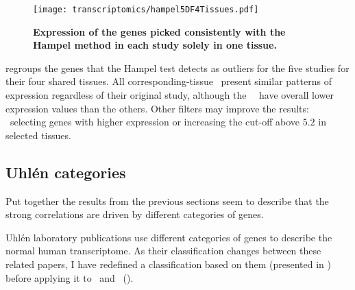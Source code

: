 \begin{figure}[!ht]
    \texttt{[image: transcriptomics/hampel5DF4Tissues.pdf]}\centering
    \caption[Expression of the genes picked with Hampel method]{\label{fig:hampelExp}%
    \textbf{Expression of the genes picked consistently with the Hampel method
    in each study solely in one tissue.}}
\end{figure}

 regroups the genes that the Hampel test detects
as outliers for the five studies for their four shared tissues.
All corresponding-tissue \treps\ present similar patterns of expression
regardless of their original study,
although the \castle\ \treps\ have overall lower expression values than the others.
Other filters may improve the results:
\eg\ selecting genes with higher expression or
increasing the cut-off above $5.2$ in selected tissues.

\subsection{Uhlén categories}\label{sub:UhlenGeneCat}

Put together the results from the previous sections seem to describe that
the strong correlations are driven by different categories of genes.

Uhlén laboratory publications 
use different categories of genes to describe the normal human transcriptome.
As their classification changes between these related papers,
I have redefined a classification based on them
(presented in )
before applying it to \setOne\ and \setTwo\ ().

